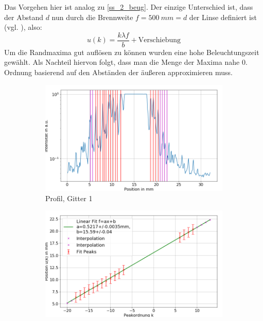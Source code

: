 \documentclass[
	a4paper,
	12pt,
	pagesize,
	ngerman
]{scrartcl}
\begin{document}
	Das Vorgehen hier ist analog zu \cref{ss_2_beug}.
	Der einzige Unterschied ist, dass der Abstand $d$ nun durch die Brennweite $f=\SI{500}{mm}=d$ der Linse definiert ist (vgl. \cite{Anleitung2}), also:
 \begin{equation}
	 \label{eq_3_beug_verschieb}
	 u(k) = \frac{k\lambda f}{b} + \text{Verschiebung}
 \end{equation}
  Um die Randmaxima gut auflösen zu können wurden eine hohe Beleuchtungszeit gewählt.
	Als Nachteil hiervon folgt, dass man die Menge der Maxima nahe 0. Ordnung basierend auf den Abständen der äußeren approximieren muss.
 \begin{figure}[H]
        \centering
        \begin{subfigure}[b]{0.475\textwidth}
            \centering
            \includegraphics[width=\textwidth]{img/3/3_trafo_g1}
            \caption%
            {Profil, Gitter 1}
            \label{fig_3_profil_g1}
        \end{subfigure}
        \hfill
        \begin{subfigure}[b]{0.475\textwidth}
            \centering
            \includegraphics[width=\textwidth]{img/3/3_trafo_g1_fit}

\end{subfigure}
\end{figure}
\end{document}
